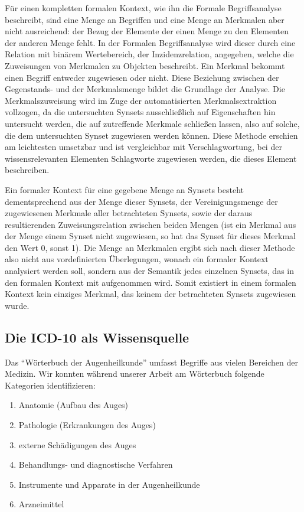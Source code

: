 \documentclass[pagesize,paper=A4,DIV=calc,fontsize=12pt,draft=false]{scrreprt}
\begin{document}
Für einen kompletten formalen Kontext, wie ihn die Formale Begriffsanalyse beschreibt, sind eine Menge an Begriffen und eine Menge an Merkmalen aber nicht ausreichend: der Bezug der Elemente der einen Menge zu den Elementen der anderen Menge fehlt. 
In der Formalen Begriffsanalyse wird dieser durch eine Relation mit binärem Wertebereich, der Inzidenzrelation, angegeben, welche die Zuweisungen von Merkmalen zu Objekten beschreibt. 
Ein Merkmal bekommt einen Begriff entweder zugewiesen oder nicht. 
Diese Beziehung zwischen der Gegenstands- und der Merkmalsmenge bildet die Grundlage der Analyse. 
Die Merkmalszuweisung wird im Zuge der automatisierten Merkmalsextraktion vollzogen, da die untersuchten Synsets ausschließlich auf Eigenschaften hin untersucht werden, die auf zutreffende Merkmale schließen lassen, also auf solche, die dem untersuchten Synset zugewiesen werden können. 
Diese Methode erschien am leichtesten umsetzbar und ist vergleichbar mit Verschlagwortung, bei der wissensrelevanten Elementen Schlagworte zugewiesen werden, die dieses Element beschreiben. 

Ein formaler Kontext für eine gegebene Menge an Synsets besteht dementsprechend aus der Menge dieser Synsets, der Vereinigungsmenge der zugewiesenen Merkmale aller betrachteten Synsets, sowie der daraus resultierenden Zuweisungsrelation zwischen beiden Mengen (ist ein Merkmal aus der Menge einem Synset nicht zugewiesen, so hat das Synset für dieses Merkmal den Wert 0, sonst 1). 
Die Menge an Merkmalen ergibt sich nach dieser Methode also nicht aus vordefinierten Überlegungen, wonach ein formaler Kontext analysiert werden soll, sondern aus der Semantik jedes einzelnen Synsets, das in den formalen Kontext mit aufgenommen wird. 
Somit existiert in einem formalen Kontext kein einziges Merkmal, das keinem der betrachteten Synsets zugewiesen wurde. 

\subsection{Die ICD-10 als Wissensquelle}

Das \enquote{Wörterbuch der Augenheilkunde} umfasst Begriffe aus vielen Bereichen der Medizin. 
Wir konnten während unserer Arbeit am Wörterbuch folgende Kategorien identifizieren: 

\begin{enumerate}
\item Anatomie (Aufbau des Auges)
\item Pathologie (Erkrankungen des Auges)
\item externe Schädigungen des Auges
\item Behandlungs- und diagnostische Verfahren
\item Instrumente und Apparate in der Augenheilkunde
\item Arzneimittel
\end{enumerate}
\end{document}
